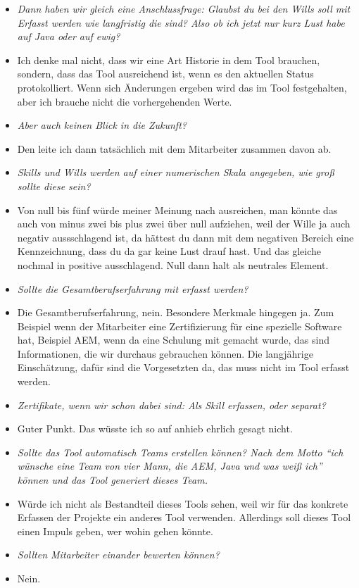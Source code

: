 \begin{appendices}
\begin{itemize}
\item[] \textit{Dann haben wir gleich eine Anschlussfrage: Glaubst du bei den Wills soll mit Erfasst werden wie langfristig die sind? Also ob ich jetzt nur kurz Lust habe auf Java oder auf ewig?}
\item[] Ich denke mal nicht, dass wir eine Art Historie in dem Tool brauchen, sondern, dass das Tool ausreichend ist, wenn es den aktuellen Status protokolliert. Wenn sich Änderungen ergeben wird das im Tool festgehalten, aber ich brauche nicht die vorhergehenden Werte.

\item[] \textit{Aber auch keinen Blick in die Zukunft?}
\item[] Den leite ich dann tatsächlich mit dem Mitarbeiter zusammen davon ab.

\item[] \textit{Skills und Wills werden auf einer numerischen Skala angegeben, wie groß sollte diese sein?}
\item[] Von null bis fünf würde meiner Meinung nach ausreichen, man könnte das auch von minus zwei bis plus zwei über null aufziehen, weil der Wille ja auch negativ aussschlagend ist, da hättest du dann mit dem negativen Bereich eine Kennzeichnung, dass du da gar keine Lust drauf hast. Und das gleiche nochmal in positive ausschlagend. Null dann halt als neutrales Element.

\item[] \textit{Sollte die Gesamtberufserfahrung mit erfasst werden?}
\item[] Die Gesamtberufserfahrung, nein. Besondere Merkmale hingegen ja. Zum Beispiel wenn der Mitarbeiter eine Zertifizierung für eine spezielle Software hat, Beispiel AEM, wenn da eine Schulung mit gemacht wurde, das sind Informationen, die wir durchaus gebrauchen können.  Die langjährige Einschätzung, dafür sind die Vorgesetzten da, das muss nicht im Tool erfasst werden.

\item[] \textit{Zertifikate, wenn wir schon dabei sind: Als Skill erfassen, oder separat?}
\item[] Guter Punkt. Das wüsste ich so auf anhieb ehrlich gesagt nicht.

\item[] \textit{Sollte das Tool automatisch Teams erstellen können? Nach dem Motto “ich wünsche eine Team von vier Mann, die AEM, Java und was weiß ich” können und das Tool generiert dieses Team.}
\item[] Würde ich nicht als Bestandteil dieses Tools sehen, weil wir für das konkrete Erfassen der Projekte ein anderes Tool verwenden. Allerdings soll dieses Tool einen Impuls geben, wer wohin gehen könnte.
\item[] \textit{Sollten Mitarbeiter einander bewerten können?}
\item[] Nein.
\end{itemize}


\end{appendices}
